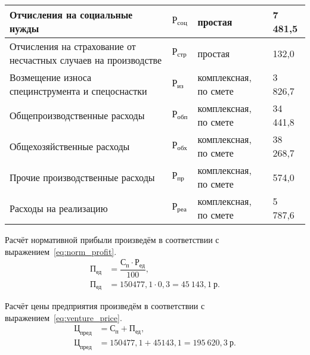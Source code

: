 \begin{table}[h!]
{\begin{tabular}{| p{} | p{} |
                      p{} | p{} |}
      Отчисления на социальные нужды & $ \text{Р}_{\text{соц}} $ &
      простая &
      7 481,5 \\ \hline

      Отчисления на страхование от несчастных случаев на \newline производстве &
      $ \text{Р}_{\text{стр}} $ & простая &
      132,0 \\ \hline

      Возмещение износа специнструмента и спецоснастки & $ \text{Р}_{\text{из}} $ &
      комплексная, по смете &
      3 826,7 \\ \hline

      Общепроизводственные \newline расходы & $ \text{Р}_{\text{обп}} $ &
      комплексная, по смете &
      34 441,8 \\ \hline

      Общехозяйственные расходы & $ \text{Р}_{\text{обх}} $ &
      комплексная, по смете &
      38 268,7 \\ \hline

      Прочие производственные \newline расходы & $ \text{Р}_{\text{пр}} $ &
      комплексная, по смете &
      574,0 \\ \hline

      Расходы на реализацию & $ \text{Р}_{\text{реа}} $ &
      комплексная, по смете &
      5 787,6 \\ \hline

    \end{tabular}
  }
\end{table}

\newpage

Расчёт нормативной прибыли произведём в соответствии с
выражением~\ref{eq:norm_profit}.
\begin{align}
  \label{eq:norm_profit}
  \text{П}_{\text{ед}} &= \dfrac{\text{С}_{\text{п}} \cdot
    \text{Р}_{\text{ед}}}{100}, \\
  \text{П}_{\text{ед}} &= 150477{,}1 \cdot 0{,}3 =
    45~143{,}1 \: \text{р.} \nonumber
\end{align}

Расчёт цены предприятия произведём в соответствии с
выражением~\ref{eq:venture_price}.
\begin{align}
  \label{eq:venture_price}
  \text{Ц}_{\text{пред}} &= \text{С}_{\text{п}} + \text{П}_{\text{ед}}, \\
  \text{Ц}_{\text{пред}} &= 150477{,}1 + 45143{,}1 =
    195~620{,}3 \: \text{р.} \nonumber
\end{align}

